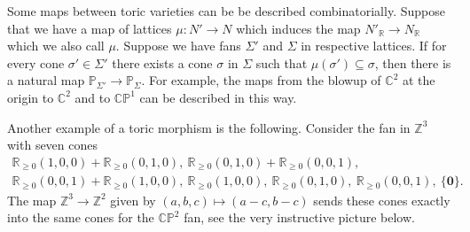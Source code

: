 \documentclass[11pt]{article}
\numberwithin{equation}{section}
\numberwithin{footnote}{section}
\newcommand{\blue}{\color{blue}}
\renewcommand{\P}{{\mathbb P}}
\newcommand{\R}{{\mathbb R}}
\newcommand{\Z}{{\mathbb Z}}
\newcommand{\C}{{\mathbb C}}
\begin{document}
\smallskip{\blue \hrule}
Some maps between toric varieties can be be described combinatorially. Suppose that we have a map of lattices
$\mu:N'\to N$ which induces the map $N'_\R\to N_\R$ which we also call $\mu$. Suppose we have  fans $\Sigma'$ and $\Sigma$ in respective lattices. If for every cone $\sigma'\in \Sigma'$ there exists a cone
$\sigma$ in $\Sigma$ such that $\mu(\sigma')\subseteq \sigma$, then there is a natural map $\P_{\Sigma'}\to \P_\Sigma$.
For example, the maps from the blowup of $\C^2$ at the origin to $\C^2$ and to $\C\P^1$ can be described in this way.



\smallskip
Another example of a toric morphism is the following. Consider the fan in $\Z^3$ with seven cones
\begin{equation}\label{fanC30}
\begin{array}{c}
\R_{\geq 0} (1,0,0)+\R_{\geq 0} (0,1,0),~\R_{\geq 0} (0,1,0)+\R_{\geq 0} (0,0,1),~\\
\R_{\geq 0} (0,0,1)+\R_{\geq 0} (1,0,0),
~\R_{\geq 0} (1,0,0),~\R_{\geq 0} (0,1,0),~\R_{\geq 0} (0,0,1),~\{{\mathbf 0}\}.
\end{array}
\end{equation}
The map $\Z^3\to \Z^2$ given by $(a,b,c)\mapsto (a-c,b-c)$ sends these cones exactly into the same cones 
for the  $\C\P^2$ fan, see the very instructive picture below. 
\end{document}
